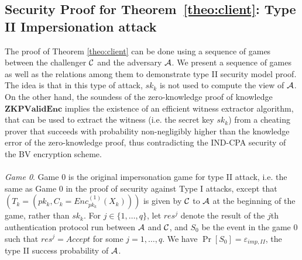 \subsection{Security Proof for Theorem~\ref{theo:client}: Type II Impersionation attack}
\label{append:ProofsTypeII}
The proof of Theorem \ref{theo:client} can be done using a sequence of games between the challenger $\mathcal{C}$ and the adversary $\mathcal{A}$. We present
a sequence of games as well as the relations among them to demonstrate type II security model proof. The idea is that in this type of attack, $sk_k$ is not used to compute the view of $\mathcal{A}$. On the other hand, the soundess of the zero-knowledge proof of knowledge $\mathbf{ZKPValidEnc}$ implies the existence of an efficient witness extractor algorithm, that can be used to extract the witness (i.e. the secret key $sk_k$) from a cheating prover that succeeds with probability non-negligibly higher than the knowledge error of the zero-knowledge proof, thus contradicting the IND-CPA security of the BV encryption scheme. \\\\
\textit{Game 0}. Game 0 is the original impersonation game for type II attack, i.e. the same as Game 0 in the proof of security against Type I attacks, except that $(T_k =(pk_k, C_k = Enc^{(1)}_{pk_k}(X_k)))$ is given by $\mathcal{C}$ to $\mathcal{A}$ at the beginning of the game, rather than $sk_k$.
For $j \in \{1,\ldots,q\}$, let $res^{j}$ denote the result of the $j$th authentication protocol run between $\mathcal{A}$ and $\mathcal{C}$, and $S_0$ be
the event in the game $0$ such that $res^{j} = Accept$ for some $j=1,\ldots,q$. We have $\Pr[S_0] = \varepsilon_{imp,II}$, the type II success probability of $\mathcal{A}$. \\\\
